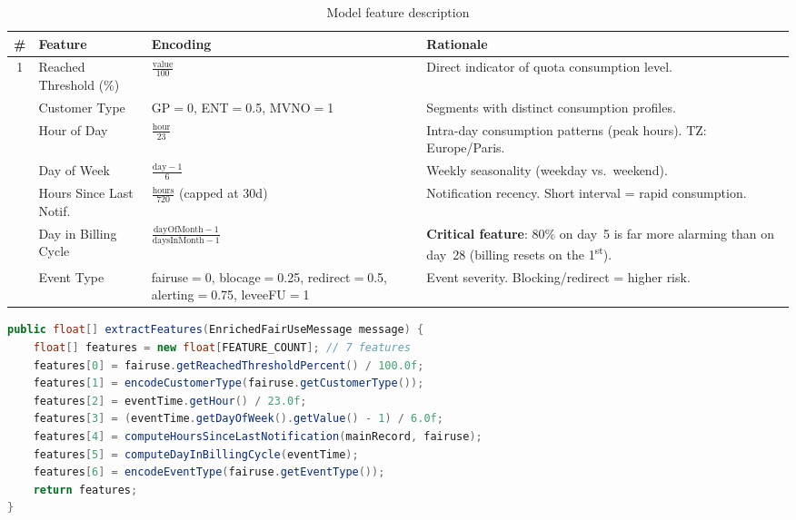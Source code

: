 \begin{table}[H]
    \centering
    \caption{Model feature description}
    \label{tab:features}
    \begin{tabularx}{\textwidth}{c l l X}
\toprule
\textbf{\#} & \textbf{Feature} & \textbf{Encoding} & \textbf{Rationale} \\
\midrule
1 & Reached Threshold (\%) & $\frac{\text{value}}{100}$ &
Direct indicator of quota consumption level. \\
\addlinespace
2 & Customer Type & GP$=$0, ENT$=$0.5, MVNO$=$1 &
Segments with distinct consumption profiles. \\
\addlinespace
3 & Hour of Day & $\frac{\text{hour}}{23}$ &
Intra-day consumption patterns (peak hours). TZ: Europe/Paris. \\
\addlinespace
4 & Day of Week & $\frac{\text{day} - 1}{6}$ &
Weekly seasonality (weekday vs.\ weekend). \\
\addlinespace
5 & Hours Since Last Notif. & $\frac{\text{hours}}{720}$ (capped at 30d) &
Notification recency. Short interval = rapid consumption. \\
\addlinespace
6 & Day in Billing Cycle & $\frac{\text{dayOfMonth} - 1}{\text{daysInMonth} - 1}$ &
\textbf{Critical feature}: 80\% on day~5 is far more alarming than on day~28 (billing resets on the 1\textsuperscript{st}). \\
\addlinespace
7 & Event Type & fairuse$=$0, blocage$=$0.25, redirect$=$0.5, alerting$=$0.75, leveeFU$=$1 &
Event severity. Blocking/redirect = higher risk. \\
\bottomrule
    \end{tabularx}
\end{table}

\begin{lstlisting}[language=Java, caption={Feature extraction (PredictionFeatureExtractor.java)}]
public float[] extractFeatures(EnrichedFairUseMessage message) {
    float[] features = new float[FEATURE_COUNT]; // 7 features
    features[0] = fairuse.getReachedThresholdPercent() / 100.0f;
    features[1] = encodeCustomerType(fairuse.getCustomerType());
    features[2] = eventTime.getHour() / 23.0f;
    features[3] = (eventTime.getDayOfWeek().getValue() - 1) / 6.0f;
    features[4] = computeHoursSinceLastNotification(mainRecord, fairuse);
    features[5] = computeDayInBillingCycle(eventTime);
    features[6] = encodeEventType(fairuse.getEventType());
    return features;
}
\end{lstlisting}

